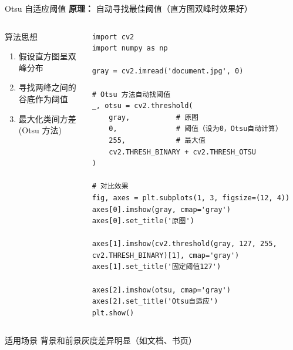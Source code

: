 \begin{frame}[fragile]{Otsu 自适应阈值}
    \textbf{原理：} 自动寻找最佳阈值（直方图双峰时效果好）

    \begin{columns}
        \begin{block}{算法思想}
            \begin{enumerate}
                \item 假设直方图呈双峰分布
                \item 寻找两峰之间的谷底作为阈值
                \item 最大化类间方差 (Otsu 方法)
            \end{enumerate}
        \end{block}

        \begin{lstlisting}[basicstyle=\ttfamily\scriptsize]
import cv2
import numpy as np

gray = cv2.imread('document.jpg', 0)

# Otsu 方法自动找阈值
_, otsu = cv2.threshold(
    gray,           # 原图
    0,              # 阈值（设为0，Otsu自动计算）
    255,            # 最大值
    cv2.THRESH_BINARY + cv2.THRESH_OTSU
)

# 对比效果
fig, axes = plt.subplots(1, 3, figsize=(12, 4))
axes[0].imshow(gray, cmap='gray')
axes[0].set_title('原图')

axes[1].imshow(cv2.threshold(gray, 127, 255, cv2.THRESH_BINARY)[1], cmap='gray')
axes[1].set_title('固定阈值127')

axes[2].imshow(otsu, cmap='gray')
axes[2].set_title('Otsu自适应')
plt.show()
        \end{lstlisting}
    \end{columns}

    \begin{alertblock}{适用场景}
        背景和前景灰度差异明显（如文档、书页）
    \end{alertblock}
\end{frame}

